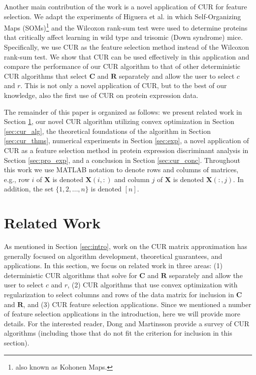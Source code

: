 \documentclass[12pt]{article}
\begin{document}
Another main contribution of the work is a novel application of CUR for feature selection. We adapt the experiments of Higuera et al. \cite{higuera_et_al_2015} in which Self-Organizing Maps (SOMs)\footnote{also known as Kohonen Maps.} and the Wilcoxon rank-sum test were used to determine proteins that critically affect learning in wild type and trisomic (Down syndrome) mice.  Specifically, we use CUR as the feature selection method instead of the Wilcoxon rank-sum test.  We show that CUR can be used effectively in this application and compare the performance of our CUR algorithm to that of other deterministic CUR algorithms that select $\mathbf{C}$ and $\mathbf{R}$ separately and allow the user to select $c$ and $r$.  This is not only a novel application of CUR, but to the best of our knowledge, also the first use of CUR on protein expression data. 

The remainder of this paper is organized as follows: we present related work in Section \ref{sec:cur_rel_work}, our novel CUR algorithm utilizing convex optimization in Section \ref{sec:cur_alg}, the theoretical foundations of the algorithm in Section \ref{sec:cur_thms}, numerical experiments in Section \ref{sec:exp}, a novel application of CUR as a feature selection method in protein expression discriminant analysis in Section \ref{sec:pro_exp}, and a conclusion in Section \ref{sec:cur_conc}.  Throughout this work we use MATLAB notation to denote rows and columns of matrices, e.g., row $i$ of $\mathbf{X}$ is denoted $\mathbf{X}(i,:)$ and column $j$ of $\mathbf{X}$ is denoted $\mathbf{X}(:,j)$.  In addition, the set $\{1, 2, ..., n \}$ is denoted $[n]$. 

\section{Related Work}
\label{sec:cur_rel_work}

As mentioned in Section \ref{sec:intro}, work on the CUR matrix approximation has generally focused on algorithm development, theoretical guarantees, and applications. In this section, we focus on related work in three areas: (1) deterministic CUR algorithms that solve for $\mathbf{C}$ and $\mathbf{R}$ separately and allow the user to select $c$ and $r$, (2) CUR algorithms that use convex optimization with regularization to select columns and rows of the data matrix for inclusion in $\mathbf{C}$ and $\mathbf{R}$, and (3) CUR feature selection applications.  Since we mentioned a number of feature selection applications in the introduction, here we will provide more details.  For the interested reader, Dong and Martinsson \cite{dong_martinsson_2023} provide a survey of CUR algorithms (including those that do not fit the criterion for inclusion in this section). 
\end{document}
